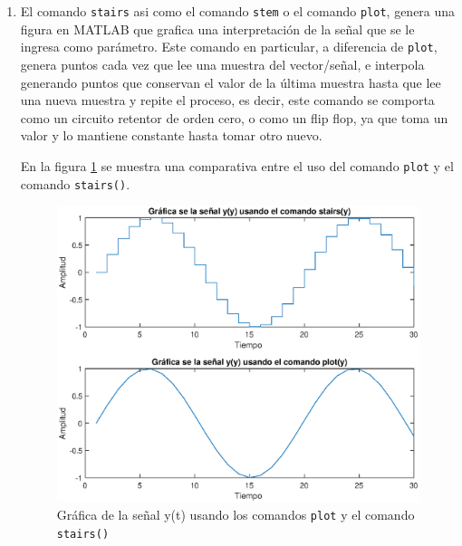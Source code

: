 \begin{enumerate}
    
    \item El comando \texttt{stairs} asi como el comando \texttt{stem} o el comando \texttt{plot}, genera una figura en MATLAB que grafica una interpretación de la señal que se le ingresa como parámetro. Este comando en particular, a diferencia de \texttt{plot}, genera puntos cada vez que lee una muestra del vector/señal, e interpola generando puntos que conservan el valor de la última muestra hasta que lee una nueva muestra y repite el proceso, es decir, este comando se comporta como un circuito retentor de orden cero, o como un flip flop, ya que toma un valor y lo mantiene constante hasta tomar otro nuevo.
    
    En la figura \ref{stairs} se muestra una comparativa entre el uso del comando \texttt{plot} y el comando \texttt{stairs()}.
    
    \begin{figure}[H]
        \centering
        \includegraphics[scale = 0.6]{Imagenes/stairs.eps}
        \caption{Gráfica de la señal y(t) usando los comandos \texttt{plot} y el comando \texttt{stairs()}}
        \label{stairs}
    \end{figure}
    
    
    
    
    
\end{enumerate}

